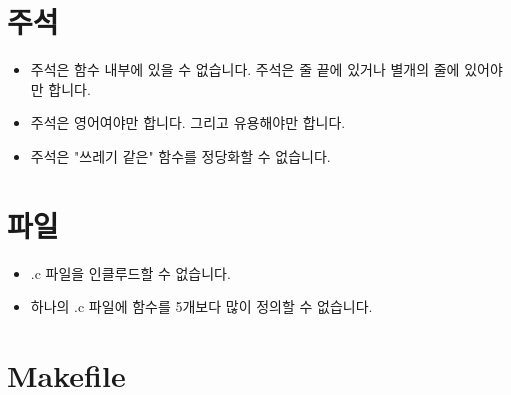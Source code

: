\documentclass{42-ko}
\begin{document}
    \section{주석}

        \begin{itemize}

            \item 주석은 함수 내부에 있을 수 없습니다. 
                주석은 줄 끝에 있거나 별개의 줄에 있어야만 합니다.

            \item 주석은 영어여야만 합니다. 그리고 유용해야만 합니다.

            \item 주석은 "쓰레기 같은" 함수를 정당화할 수 없습니다.

        \end{itemize}
        \newpage


    \section{파일}

        \begin{itemize}

            \item .c 파일을 인클루드할 수 없습니다.

            \item 하나의 .c 파일에 함수를 5개보다 많이 정의할 수 없습니다.

        \end{itemize}
        \newpage


    \section{Makefile}
\end{document}
